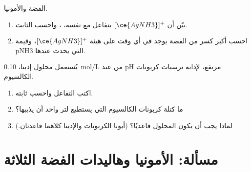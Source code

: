 \begin{exercise}[$\star\star\star$]\label{exo:b1:complexation:11}
الفضة والأمونيا.
\begin{enumerate}
  \item بيّن أن $[\ce{AgNH3}]^{+}$ يتفاعل مع نفسه،
        ، واحسب الثابت.
  \item احسب أكبر كسر من الفضة يوجد في أي وقت على هيئة
        $[\ce{AgNH3}]^{+}$، وقيمة pNH3 التي يحدث عندها.
\end{enumerate}
\end{exercise}

\begin{exercise}[$\star\star\star$]\label{exo:b1:complexation:12}
يُستعمل محلول إديتا، \qty{0.10}{mol/L} من  عند pH مرتفع، لإذابة
ترسبات كربونات الكالسيوم.
\begin{enumerate}
  \item اكتب التفاعل واحسب ثابته.
  \item ما كتلة كربونات الكالسيوم التي يستطيع لتر واحد أن يذيبها؟
  \item لماذا يجب أن يكون المحلول قاعديًا؟ (أيونا الكربونات والإديتا
        كلاهما قاعدتان.)
\end{enumerate}
\end{exercise}

\section{مسألة: الأمونيا وهاليدات الفضة الثلاثة}

